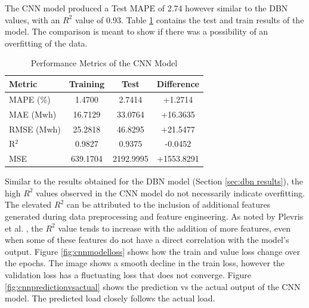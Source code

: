  The CNN model produced a Test MAPE of 2.74 however similar to the DBN values, with an $R^2$ value of 0.93. Table \ref{tab:cnn_performance_diff} contains the test and train results of the model. The comparison is meant to show if there was a possibility of an overfitting of the data.
 \begin{table}[h]
 	\centering
 	\caption{Performance Metrics of the CNN Model}
 	\label{tab:cnn_performance_diff}
 	\begin{tabular}{lccc}
 		\hline
 		\textbf{Metric} & \textbf{Training} & \textbf{Test} & \textbf{Difference} \\
 		\hline
 		MAPE (\%) & 1.4700 & 2.7414 & +1.2714 \\
 		MAE (Mwh) & 16.7129 & 33.0764 & +16.3635 \\
 		RMSE (Mwh) & 25.2818 & 46.8295 & +21.5477 \\
 		R$^2$ & 0.9827 & 0.9375 & -0.0452 \\
 		MSE & 639.1704 & 2192.9995 & +1553.8291 \\
 		\hline
 	\end{tabular}
 \end{table}
Similar to the results obtained for the DBN model (Section \ref{sec:dbn results}), the high $R^2$ values observed in the CNN model do not necessarily indicate overfitting. The elevated $R^2$ can be attributed to the inclusion of additional features generated during data preprocessing and feature engineering. As noted by Plevris et al. \cite{plevris2022investigation}, the $R^2$ value tends to increase with the addition of more features, even when some of these features do not have a direct correlation with the model’s output. Figure \ref{fig:cnnmodelloss} shows how the train and value loss change over the epochs. The image shows a smooth decline in the train loss, however the validation loss has a fluctuating loss that does not converge.
Figure \ref{fig:cnnpredictionvsactual} shows the prediction vs the actual output of the CNN model. The predicted load closely follows the actual load.
